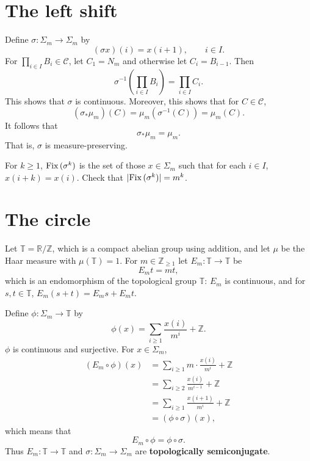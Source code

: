 \documentclass{article}
\newcommand{\Fix}{\ensuremath\mathrm{Fix}\,}
\theoremstyle{definition}
\begin{document}
\section{The left shift}
Define
$\sigma:\Sigma_m \to \Sigma_m$ by
\[
(\sigma x)(i) = x(i+1),\qquad i \in I.
\]
For $\prod_{i \in I} B_i \in \mathscr{C}$, let $C_1=N_m$ and otherwise let $C_i=B_{i-1}$. Then
\[
\sigma^{-1} \left( \prod_{i \in I} B_i \right) = \prod_{i \in I} C_i.
\]
This shows that $\sigma$ is continuous. 
Moreover, this shows that for $C \in \mathscr{C}$,
\[
(\sigma_* \mu_m)(C) = \mu_m(\sigma^{-1}(C)) = \mu_m(C).
\]
It follows that
\begin{equation}
\sigma_* \mu_m = \mu_m.
\label{sigmamum}
\end{equation}
That is,
$\sigma$ is measure-preserving.

For $k \geq 1$,
$\Fix(\sigma^k)$ is the set of those $x \in \Sigma_m$ such that 
for each $i \in I$, $x(i+k)=x(i)$. Check that
$|\Fix(\sigma^k)| = m^k$. 





\section{The circle}
Let $\mathbb{T} = \mathbb{R} / \mathbb{Z}$, which is a compact abelian group using addition, and let
$\mu$ be the Haar measure with $\mu(\mathbb{T})=1$. 
For $m \in \mathbb{Z}_{\geq 1}$ let $E_m:\mathbb{T} \to \mathbb{T}$ be
\[
E_m t =mt,
\]
which is an endomorphism of the topological group $\mathbb{T}$: $E_m$ is continuous, and for
$s,t \in \mathbb{T}$, $E_m(s+t) = E_m s+E_m t$. 


Define $\phi:\Sigma_m \to \mathbb{T}$ by
\[
\phi(x) = \sum_{i \geq 1} \frac{x(i)}{m^i} + \mathbb{Z}.
\]
$\phi$ is continuous and surjective.
For $x \in \Sigma_m$,
\begin{align*}
(E_m \circ \phi)(x) &= \sum_{i \geq 1} m\cdot \frac{x(i)}{m^i} + \mathbb{Z}\\
&= \sum_{i \geq 2}  \frac{x(i)}{m^{i-1}} + \mathbb{Z}\\
&=\sum_{i \geq 1}  \frac{x(i+1)}{m^i} + \mathbb{Z}\\
&=(\phi \circ \sigma)(x),
\end{align*}
which means that
\begin{equation}
E_m \circ \phi = \phi \circ \sigma.
\label{semiconjugate}
\end{equation}
Thus $E_m:\mathbb{T} \to \mathbb{T}$ and 
$\sigma:\Sigma_m \to \Sigma_m$ are 
\textbf{topologically semiconjugate}.
\end{document}
